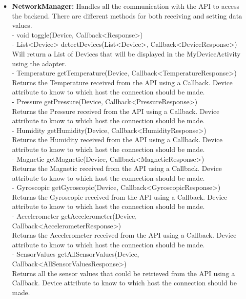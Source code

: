 \documentclass[a4paper]{article}
\begin{document}
\begin{itemize}
		\item{\textbf{NetworkManager:}} 
		Handles all the communication with the API to access the backend. There are different methods for both receiving and setting data values.\\
        - void toggle(Device, Callback<Response>)\\
        - List<Device> detectDevices(List<Device>, Callback<DeviceResponse>) Will return a List of Devices that will be displayed in the MyDeviceActivity using the adapter.\\
        - Temperature getTemperature(Device, Callback<TemperatureResponse>)\\ Returns the Temperature received from the API using a Callback. Device attribute to know to which host the connection should be made.\\
        - Pressure getPressure(Device, Callback<PressureResponse>)\\ Returns the Pressure received from the API using a Callback. Device attribute to know to which host the connection should be made.\\
        - Humidity getHumidity(Device, Callback<HumidityResponse>)\\ 
        Returns the Humidity received from the API using a Callback. Device attribute to know to which host the connection should be made.\\
        - Magnetic getMagnetic(Device, Callback<MagneticResponse>)\\ Returns the Magnetic received from the API using a Callback. Device attribute to know to which host the connection should be made.\\
        - Gyroscopic getGyroscopic(Device, Callback<GyroscopicResponse>)\\ Returns the Gyroscopic received from the API using a Callback. Device attribute to know to which host the connection should be made.\\
        - Accelerometer getAccelerometer(Device, Callback<AccelerometerResponse>)\\ Returns the Accelerometer received from the API using a Callback. Device attribute to know to which host the connection should be made.\\
        - SensorValues getAllSensorValues(Device, Callback<AllSensorValuesResponse>)\\ Returns all the sensor values that could be retrieved from the API using a Callback. Device attribute to know to which host the connection should be made.\\

\end{itemize}
\end{document}
